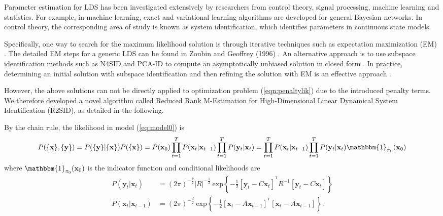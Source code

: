 \documentclass[fleqn]{article}
\let\oldref\ref
\renewcommand{\ref}[1]{(\oldref{#1})}
\newcommand{\T}{^{\ensuremath{\mathsf{T}}}}           %
\begin{document}
Parameter estimation for LDS has been investigated extensively by researchers from control theory, signal processing, machine learning and statistics. For example, in machine learning, exact and variational learning algorithms are developed for general Bayesian networks. In control theory, the corresponding area of study is known as system identification, which identifies parameters in continuous state models.

Specifically, one way to search for the maximum likelihood solution is through iterative techniques such as expectation maximization (EM) \cite{shumway1982approach}. The detailed EM steps for a generic LDS can be found in Zoubin and Geoffrey (1996) \cite{ghahramani1996parameter}. An alternative approach is to use subspace identification methods such as N4SID and PCA-ID to compute an asymptotically unbiased solution in closed form \cite{van1994n4sid} \cite{doretto2003dynamic}. In practice, determining an initial solution with subspace identification and then refining the solution with EM is an effective approach \cite{bootslearning}.

However, the above solutions can not be directly applied to optimization problem \ref{eqn:penaltylik} due to the introduced penalty terms. We therefore developed a novel algorithm called Reduced Rank M-Estimation for High-Dimensional Linear Dynamical System Identification (R2SID), as detailed in the following.

By the chain rule, the likelihood in model \ref{eq:model0} is
\begin{equation*}\label{eqn:likelihood}
P(\{\mathbf{x}\},\{\mathbf{y}\})=P(\{\mathbf{y}\}|\{\mathbf{x}\}) P(\{\mathbf{x}\})= P(\mathbf{x}_0)\prod\limits_{t=1}^{T}P(\mathbf{x}_t|\mathbf{x}_{t-1})\prod\limits_{t=1}^{T} P(\mathbf{y}_t|\mathbf{x}_t)=\prod\limits_{t=1}^{T}P(\mathbf{x}_t|\mathbf{x}_{t-1})\prod\limits_{t=1}^{T} P(\mathbf{y}_t|\mathbf{x}_t)\mathbbm{1}_{\mathbf{\pi}_0}(\mathbf{x}_0)
\end{equation*}
where $\mathbbm{1}_{\mathbf{\pi}_0}(\mathbf{x}_0)$ is the indicator function and conditional likelihoods are
\begin{equation*}\label{eqn:condlik}
\begin{aligned}
P(\mathbf{y}_t|\mathbf{x}_t)&= (2\pi)^{-\frac{p}{2}}|R|^{-\frac{1}{2}}\  \text{exp}\left\{-\frac{1}{2}[\mathbf{y}_t-C\mathbf{x}_t]^{\T}R^{-1}[\mathbf{y}_t-C\mathbf{x}_t]\right\}\\
P(\mathbf{x}_t|\mathbf{x}_{t-1})
&=(2\pi)^{-\frac{d}{2}}\  \text{exp}\left\{-\frac{1}{2}[\mathbf{x}_t-A\mathbf{x}_{t-1}]^{\T}[\mathbf{x}_t-A\mathbf{x}_{t-1}]\right\}.
\end{aligned}
\end{equation*}
\end{document}
